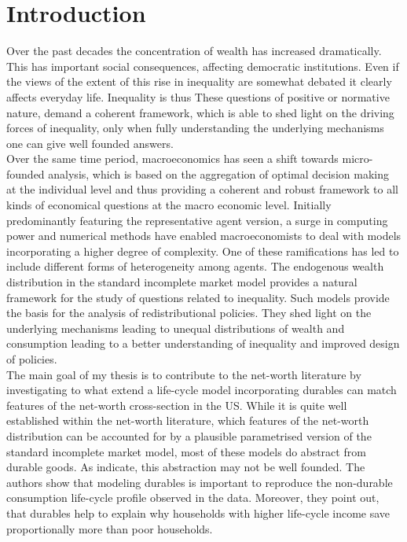 \documentclass[a4paper,12pt,legno]{article}
\begin{document}
\listoffigures

 \newpage



\setcounter{page}{1}        %


\section{Introduction}
\label{Chapter1}
Over the past decades the concentration of wealth has increased dramatically. This has important social consequences, affecting democratic institutions. Even if the views of the extent of this rise in inequality are somewhat debated it clearly affects everyday life. Inequality is thus 
These questions of positive or normative nature, demand a coherent framework, which is able to shed light on the driving forces of inequality, only when fully understanding the underlying mechanisms one can give well founded answers.\\ 
Over the same time period, macroeconomics has seen a shift towards micro-founded analysis, which is based on the aggregation of optimal decision making at the individual level and thus providing a coherent and robust framework to all kinds of economical questions at the macro economic level. Initially predominantly featuring the representative agent version, a surge in computing power and numerical methods have enabled macroeconomists to deal with models incorporating a higher degree of complexity. One of these ramifications has led to include different forms of heterogeneity among agents. The endogenous wealth distribution in the standard incomplete market model provides a natural framework for the study of questions related to inequality. Such models provide the basis for the analysis of redistributional policies. They shed light on the underlying mechanisms leading to unequal distributions of wealth and consumption leading to a better understanding of inequality and improved design of policies. \\

The main goal of my thesis is to contribute to the net-worth literature by investigating to what extend a life-cycle model incorporating durables can match features of the net-worth cross-section in the US. While it is quite well established within the net-worth literature, which features of the net-worth distribution can be accounted for by a plausible parametrised version of the standard incomplete market model, most of these models do abstract from durable goods. As \cite{FV&K2011}  indicate, this abstraction may not be well founded. The authors show that modeling durables is important to reproduce the non-durable consumption life-cycle profile observed in the data. Moreover, they point out, that durables help to explain why households with higher life-cycle income save proportionally more than poor households.\\
\end{document}
